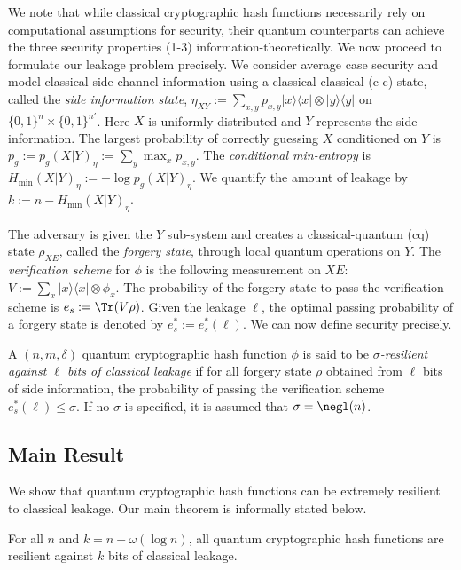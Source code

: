 We note that while classical cryptographic hash functions necessarily rely on computational assumptions for security, their quantum counterparts can achieve the three security properties (1-3) information-theoretically.
We now proceed to formulate our leakage problem precisely. We consider average case
security and model classical side-channel information using a classical-classical (c-c) state,
called the {\em side information state},
$
\eta_{XY}:=\sum_{x,y} p_{x, y} |x\rangle\langle x|\otimes|y\rangle\langle y|$
on $\{0, 1\}^n\times\{0, 1\}^{n'}$. Here $X$ is uniformly distributed and $Y$ represents
the side information. The largest probability of correctly guessing $X$ conditioned on $Y$
is $p_g:=p_g(X|Y)_\eta:=\sum_{y} \max_x p_{x, y}$. The {\em conditional min-entropy} is
$H_{\text{min}}(X|Y)_\eta:=-\log p_g(X|Y)_\eta$. We quantify the amount of leakage by 
$k:=n-H_{\text{min}}(X|Y)_\eta$.



The adversary is given the $Y$ sub-system and creates a classical-quantum (cq) state $\rho_{XE}$,
called the {\em forgery state},
through local quantum operations on $Y$. 
The {\em verification scheme} for $\phi$ is the following measurement on $XE$:
$
V := \sum_{x}|x\rangle\langle x|\otimes\phi_x$.
The probability of the forgery state to pass the verification scheme is 
$e_s:=\Tr(V\rho)$. Given the leakage $\ell$, the optimal passing probability of a forgery state is
denoted by $e_s^*:=e_s^*(\ell)$.
We can now define security precisely.

\begin{definition}
A $(n, m, \delta)$ quantum cryptographic hash function $\phi$ is said to be {\em $\sigma$-resilient against $\ell$
bits of classical leakage} if for all forgery state $\rho$ obtained from $\ell$ bits of side information,
the probability of passing the verification scheme $e_s^*(\ell)\leq \sigma$. If no $\sigma$ is specified, it is assumed that $\sigma=\negl(n)$.
\end{definition}


\subsection{Main Result}
We show that quantum cryptographic hash functions can be extremely resilient to classical leakage. Our main theorem is informally stated below.

\begin{theorem}\label{thm:main}
For all $n$ and $k=n-\omega(\log n)$, 
all quantum cryptographic hash functions are resilient against $k$ bits of classical leakage.
\end{theorem}

